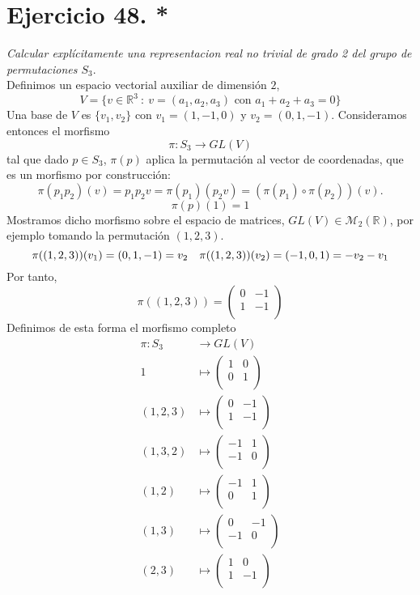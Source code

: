 \section{Ejercicio 48. *}
\emph{Calcular explícitamente una representacion real no trivial de grado 2 del grupo de permutaciones \(S_{3}\)}.\\

Definimos un espacio vectorial auxiliar de dimensión \(2\),
\[
  V = \Big\{ v \in \mathbb{R}^{3} \ : \ v = (a_{1},a_{2},a_{3}) \text{ con } a_{1}+a_{2}+a_{3} = 0 \Big\}
\]
Una base de \(V\) es \(\{v_{1}, v_{2}\}\) con \(v_{1} = (1,-1,0)\) y \(v_{2} = (0,1,-1)\). Consideramos entonces el morfismo
\[
  \pi: S_{3} \to GL(V)
\]
tal que dado \(p \in S_{3}\), \(\pi(p)\) aplica la permutación al vector de coordenadas, que es un morfismo por construcción:
\[
  \pi(p_{1}p_{2})(v) = p_{1}p_{2}v = \pi(p_{1})(p_{2}v) = (\pi(p_{1})\circ \pi(p_{2})) (v).
\]
\[
  \pi(p)(1) = 1
\]
Mostramos dicho morfismo sobre el espacio de matrices, \(GL(V) \in \mathcal{M}_{2}(\mathbb{R})\), por ejemplo tomando la permutación \((1,2,3)\).
\[
  \pi((1,2,3))(v_{1}) = (0,1,-1) = v_{2} \quad \pi((1,2,3))(v_{2}) = (-1,0,1) = -v_{2}-v_{1}\\
\]
Por tanto,
\[
  \pi((1,2,3)) = \begin{pmatrix} 0 & -1\\ 1 & -1 \\ \end{pmatrix}
\]
Definimos de esta forma el morfismo completo
\[
  \begin{aligned}
    \pi: S_{3} &\to GL(V)\\
    1 &\mapsto  \begin{pmatrix} 1 & 0\\ 0 & 1 \\ \end{pmatrix}\\
    (1,2,3) &\mapsto  \begin{pmatrix} 0 & -1\\ 1 & -1 \\ \end{pmatrix}\\
    (1,3,2) &\mapsto  \begin{pmatrix} -1 & 1\\ -1 & 0 \\ \end{pmatrix}\\
    (1,2) &\mapsto  \begin{pmatrix} -1 & 1\\ 0 & 1 \\ \end{pmatrix}\\
    (1,3) &\mapsto  \begin{pmatrix} 0 & -1\\ -1 & 0 \\ \end{pmatrix}\\
    (2,3) &\mapsto  \begin{pmatrix} 1 & 0\\ 1 & -1 \\ \end{pmatrix}\\
  \end{aligned}
\]
